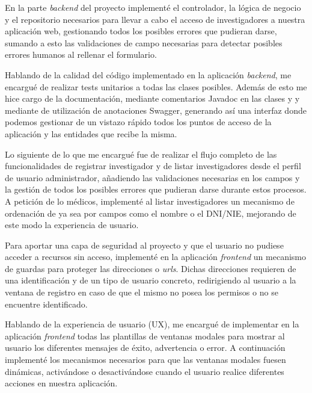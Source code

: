 En la parte \textit{backend} del proyecto implementé el controlador, la lógica de negocio y el repositorio necesarios para llevar a cabo el acceso de investigadores a nuestra aplicación web, gestionando todos los posibles errores que pudieran darse, sumando a esto las validaciones de campo necesarias para detectar posibles errores humanos al rellenar el formulario. \newline

Hablando de la calidad del código implementado en la aplicación \textit{backend}, me encargué de realizar tests unitarios a todas las clases posibles. Además de esto me hice cargo de la documentación, mediante comentarios Javadoc en las clases y y mediante de utilización de anotaciones Swagger, generando así una interfaz donde podemos gestionar de un vistazo rápido todos los puntos de acceso de la aplicación y las entidades que recibe la misma. \newline

Lo siguiente de lo que me encargué fue de realizar el flujo completo de las funcionalidades de registrar investigador y de listar investigadores desde el perfil de usuario administrador, añadiendo las validaciones necesarias en los campos y la gestión de todos los posibles errores que pudieran darse durante estos procesos. A petición de lo médicos, implementé al listar investigadores un mecanismo de ordenación de ya sea por campos como el nombre o el DNI/NIE, mejorando de este modo la experiencia de usuario. \newline

Para aportar una capa de seguridad al proyecto y que el usuario no pudiese acceder a recursos sin acceso, implementé en la aplicación \textit{frontend} un mecanismo de guardas para proteger las direcciones o \textit{urls}. Dichas direcciones requieren de una identificación y de un tipo de usuario concreto, redirigiendo al usuario a la ventana de registro en caso de que el mismo no posea los permisos o no se encuentre identificado. \newline

Hablando de la experiencia de usuario (UX), me encargué de implementar en la aplicación \textit{frontend} todas las  plantillas de ventanas modales para mostrar al usuario los diferentes mensajes de éxito, advertencia o error. A continuación implementé los mecanismos necesarios para que las ventanas modales fuesen dinámicas, activándose o desactivándose cuando el usuario realice diferentes acciones en nuestra aplicación. \newline

